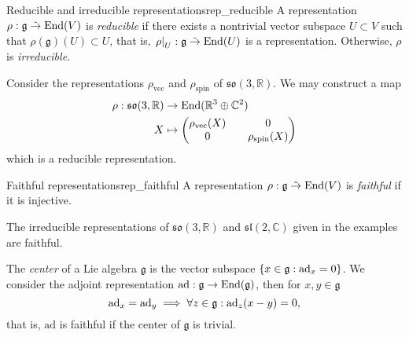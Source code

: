 \begin{definition}{Reducible and irreducible representations}{rep_reducible}
    A representation \(\rho : \mathfrak{g} \mathrel{\tilde{\to}} \operatorname{End}(V)\) is \emph{reducible} if there exists a nontrivial vector subspace \(U \subset V\) such that \(\rho(\mathfrak{g})(U) \subset U\), that is, \(\left.\rho\right\rvert_{U} : \mathfrak{g} \mathrel{\tilde{\to}} \operatorname{End}(U)\) is a representation. Otherwise, \(\rho\) is \emph{irreducible.}
\end{definition}
\begin{example}
    Consider the representations \(\rho_{\mathrm{vec}}\) and \(\rho_{\mathrm{spin}}\) of \(\mathfrak{so}(3,\mathbb{R})\). We may construct a map
        \begin{align*}
            \rho : \mathfrak{so}(3, \mathbb{R}) &\to \operatorname{End}(\mathbb{R}^3 \oplus \mathbb{C}^2)\\
                                              X &\mapsto \begin{pmatrix}
                                                    \rho_{\mathrm{vec}}(X) && 0\\
                                                    0 && \rho_{\mathrm{spin}}(X)
                                                \end{pmatrix}
        \end{align*}
        which is a reducible representation.
\end{example}

\begin{definition}{Faithful representations}{rep_faithful}
    A representation \(\rho : \mathfrak{g} \mathrel{\tilde{\to}} \operatorname{End}(V)\) is \emph{faithful} if it is injective.
\end{definition}
\begin{remark}
    The irreducible representations of \(\mathfrak{so}(3,\mathbb{R})\) and \(\mathfrak{sl}(2,\mathbb{C})\) given in the examples are faithful.

    The \emph{center} of a Lie algebra \(\mathfrak{g}\) is the vector subspace \(\{x \in \mathfrak{g} : \operatorname{ad}_{x} = 0\}\). We consider the adjoint representation \(\mathrm{ad} : \mathfrak{g} \to \operatorname{End}(\mathfrak{g})\), then for \(x, y \in \mathfrak{g}\)
    \begin{equation*}
        \operatorname{ad}_{x} = \operatorname{ad}_{y} \implies \forall z \in \mathfrak{g} : \operatorname{ad}_{z}(x-y) = 0,
    \end{equation*}
    that is, \(\mathrm{ad}\) is faithful if the center of \(\mathfrak{g}\) is trivial.
\end{remark}

